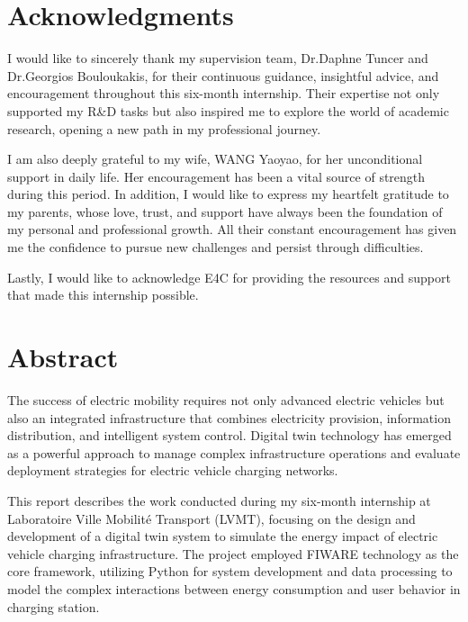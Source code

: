\documentclass[11pt]{memoir}
\begin{document}
\setcounter{secnumdepth}{3}
\thispagestyle{empty}




\chapter*{Acknowledgments}

I would like to sincerely thank my supervision team, Dr.Daphne Tuncer and Dr.Georgios Bouloukakis, for their continuous guidance, insightful advice, and encouragement throughout this six-month internship. Their expertise not only supported my R\&D tasks but also inspired me to explore the world of academic research, opening a new path in my professional journey.

I am also deeply grateful to my wife, WANG Yaoyao, for her unconditional support in daily life. Her encouragement has been a vital source of strength during this period. In addition, I would like to express my heartfelt gratitude to my parents, whose love, trust, and support have always been the foundation of my personal and professional growth. All their constant encouragement has given me the confidence to pursue new challenges and persist through difficulties.

Lastly, I would like to acknowledge E4C for providing the resources and support that made this internship possible.



\newpage



\chapter*{Abstract}

The success of electric mobility requires not only advanced electric vehicles but also an integrated infrastructure that combines electricity provision, information distribution, and intelligent system control. Digital twin technology has emerged as a powerful approach to manage complex infrastructure operations and evaluate deployment strategies for electric vehicle charging networks.

This report describes the work conducted during my six-month internship at Laboratoire Ville Mobilité Transport (LVMT), focusing on the design and development of a digital twin system to simulate the energy impact of electric vehicle charging infrastructure. The project employed FIWARE technology as the core framework, utilizing Python for system development and data processing to model the complex interactions between energy consumption and user behavior in charging station.
\end{document}
